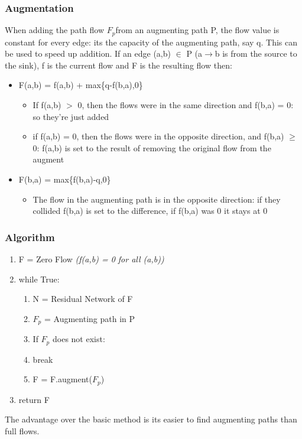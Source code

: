 \subsubsection{Augmentation}
When adding the path flow $F_p$from an augmenting path P, the flow value is constant for every edge: its the capacity of the augmenting path, say q. This can be used to speed up addition. If an edge (a,b) $\in$ P (a$\rightarrow$b is from the source to the sink), f is the current flow and F is the resulting flow then:
\begin{itemize}
    \item F(a,b) = f(a,b) + max\{q-f(b,a),0\}
        \begin{itemize}
            \item If f(a,b) $>$ 0, then the flows were in the same direction and f(b,a) = 0: so they're just added
            \item if f(a,b) = 0, then the flows were in the opposite direction, and f(b,a) $\geq$ 0: f(a,b) is set to the result of removing the original flow from the augment 
        \end{itemize}
    \item F(b,a) = max\{f(b,a)-q,0\}
        \begin{itemize}
            \item The flow in the augmenting path is in the opposite direction: if they collided f(b,a) is set to the difference, if f(b,a) was 0 it stays at 0
        \end{itemize}    
\end{itemize}

\newpage
\subsubsection{Algorithm}
\begin{enumerate}[label=\Alph*]
    \item F = Zero Flow \emph{(f(a,b) = 0 for all (a,b))}
    \item while True: 
\begin{enumerate}[label=\arabic*]
    \item N = Residual Network of F
    \item $F_p$ = Augmenting path in P
    \item If $F_p$ does not exist:
    \item [] \quad break
    \item F = F.augment($F_p$)
\end{enumerate}  
\item return F
\end{enumerate}
The advantage over the basic method is its easier to find augmenting paths than full flows. 


